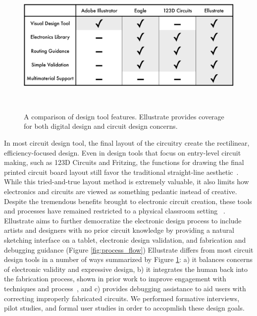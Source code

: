 \documentclass{sigchi}
\begin{document}
\begin{figure}[b]
\centering
  \includegraphics[width=1\columnwidth]{figures/comparative_table.pdf}
  \caption{A comparison of design tool features. Ellustrate provides coverage for both digital design and circuit design concerns. }~\label{fig:comparison_table}
  \vspace{-16pt}
\end{figure}

In most circuit design tool, the final layout of the circuitry create the rectilinear, efficiency-focused design.
Even in design tools that focus on entry-level circuit making, such as 123D Circuits and Fritzing, the functions for drawing the final printed circuit board layout still favor the traditional straight-line aesthetic~\cite{_autodesk123d_????}.
While this tried-and-true layout method is extremely valuable, it also limits how electronics and circuits are viewed as something pedantic instead of creative. Despite the tremendous benefits brought to electronic circuit creation, these tools and processes have remained restricted to a physical classroom setting ~\cite{qi_stickers_2015,qi_sketching_2014}. Ellustrate aims to further democratize the electronic design process to include artists and designers with no prior circuit knowledge by providing a natural sketching interface on a tablet, electronic design validation, and fabrication and debugging guidance (Figure \ref{fig:process_flow})
Ellustrate differs from most circuit design tools in a number of ways summarized by Figure \ref{fig:comparison_table}: a) it balances concerns of electronic validity and expressive design, b) it integrates the human back into the fabrication process, shown in prior work to improve engagement with techniques and process~\cite{anonmyzied_proxy}, and c) provides debugging assistance to aid users with correcting improperly fabricated circuits. We performed formative interviews, pilot studies, and formal user studies in order to accopmlish these design goals. 
\end{document}
